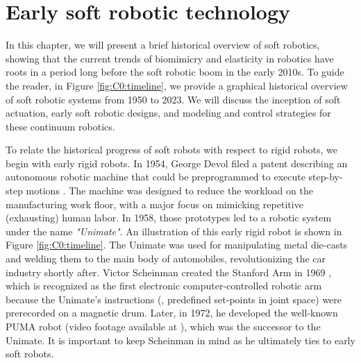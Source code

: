 \section{Early soft robotic technology}
In this chapter, we will present a brief historical overview of soft robotics, showing that the current trends of biomimicry and elasticity in robotics have roots in a period long before the soft robotic boom in the early 2010s. To guide the reader, in Figure \ref{fig:C0:timeline}, we provide a graphical historical overview of soft robotic systems from 1950 to 2023. We will discuss the inception of soft actuation, early soft robotic designs, and modeling and control strategies for these continuum robotics.

To relate the historical progress of soft robots with respect to rigid robots, we begin with early rigid robots. In 1954, George Devol filed a patent describing an autonomous robotic machine that could be preprogrammed to execute step-by-step motions \cite{Mickle2008}. The machine was designed to reduce the workload on the manufacturing work floor, with a major focus on mimicking repetitive (exhausting) human labor. In 1958, those prototypes led to a robotic system under the name \textit{"Unimate"}. An illustration of this early rigid robot is shown in Figure \ref{fig:C0:timeline}. The Unimate was used for manipulating metal die-casts and welding them to the main body of automobiles, revolutionizing the car industry shortly after. Victor Scheinman created the Stanford Arm in 1969 \cite{BibEntryStanford2022Sep,BibEntryOrm2019Sep}, which is recognized as the first electronic computer-controlled robotic arm because the Unimate's instructions (\ie, predefined set-points in joint space) were prerecorded on a magnetic drum. Later, in 1972, he developed the well-known PUMA robot (video footage available at \cite{BibEntryPuma2022Sep}), which was the successor to the Unimate. It is important to keep Scheinman in mind as he ultimately ties to early soft robots.\vspace{0.085em}

